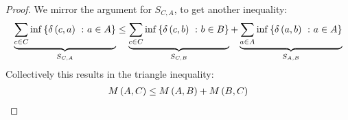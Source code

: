 \documentclass[12pt]{article}
\begin{document}
\begin{proof}
  We mirror the argument for \(S_{C, A}\),
  to get another inequality:
  \begin{align*}
    \underbrace{
      \sum_{c \in C} \inf\left\{\delta\left(c, a\right) \ \colon a \in A\right\}
    }_{S_{C, A}}
      \leq
      \underbrace{
        \sum_{c \in C} \inf\left\{\delta\left(c, b\right) \ \colon b \in B\right\}
      }_{S_{C, B}} +
      \underbrace{
        \sum_{a \in A} \inf\left\{\delta\left(a, b\right) \ \colon a \in A\right\}
      }_{S_{A, B}}
  \end{align*}
  Collectively this results in the triangle inequality:
  \begin{align*}
    M\left(A, C\right) \leq M\left(A, B\right) + M\left(B, C\right)
  \end{align*}
  
\end{proof}



\pagebreak

\printbibliography
\end{document}
